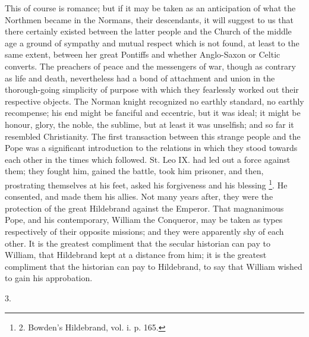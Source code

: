 This of course is romance; but
if it may be taken as an anticipation of what the Northmen became in
the Normans, their descendants, it will suggest to us that there
certainly existed between the latter people and the Church of the
middle age a ground of sympathy and mutual respect which is not found,
at least to the same extent, between her great Pontiffs and whether
Anglo-Saxon or Celtic converts. The preachers of peace and the
messengers of war, though as contrary as life and death, nevertheless
had a bond of attachment and union in the thorough-going simplicity of
purpose with which they fearlessly worked out their respective
objects. The Norman knight recognized no earthly standard, no earthly
recompense; his end might be fanciful and eccentric, but it was ideal;
it might be honour, glory, the noble, the sublime, but at least it was
unselfish; and so far it resembled Christianity. The first transaction
between this strange people and the Pope was a significant
introduction to the relations in which they stood towards each other
in the times which followed. St. Leo IX. had led out a force against
them; they fought him, gained the battle, took him prisoner, and then,
prostrating themselves at his feet, asked his forgiveness and his
blessing \footnote{2.
Bowden's Hildebrand, vol. i. p. 165.}. He consented,
and made them his allies. Not many years after, they were the
protection of the great Hildebrand against the Emperor. That
magnanimous Pope, and his contemporary, William the Conqueror,
may be taken as types respectively of their opposite missions; and
they were apparently shy of each other. It is the greatest compliment
that the secular historian can pay to William, that Hildebrand kept at
a distance from him; it is the greatest compliment that the historian
can pay to Hildebrand, to say that William wished to gain his
approbation.

3.

